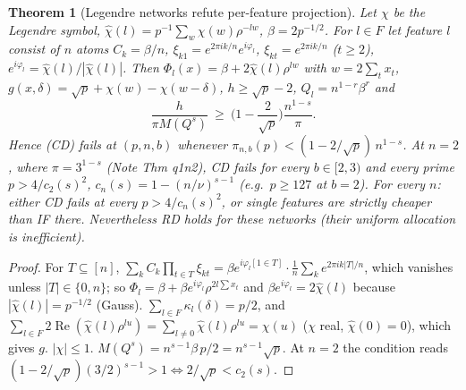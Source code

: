 \documentclass[11pt]{article}
\newtheorem{theorem}{Theorem}
\theoremstyle{remark}
\newcommand{\Re}{\operatorname{Re}}
\renewcommand{\Re}{\operatorname{Re}}
\begin{document}
\begin{theorem}[Legendre networks refute per-feature projection]\label{thm:L}
Let $\chi$ be the Legendre symbol, $\hat\chi(l)=p^{-1}\sum_w\chi(w)\rho^{-lw}$, $\beta=2p^{-1/2}$.  For $l\in F$ let feature $l$ consist of
$n$ atoms $C_k=\beta/n$, $\xi_{k1}=e^{2\pi ik/n}e^{i\varphi_l}$, $\xi_{kt}=e^{2\pi ik/n}$ ($t\ge2$), $e^{i\varphi_l}=\hat\chi(l)/|\hat\chi(l)|$.
Then $\Phi_l(x)=\beta+2\hat\chi(l)\rho^{lw}$ with $w=2\sum_tx_t$, $g(x,\delta)=\sqrt p+\chi(w)-\chi(w-\delta)$, $h\ge\sqrt p-2$,
$Q_l=n^{1-r}\beta^r$ and
\[\frac{h}{\pi M(Q^s)}\ \ge\ \Big(1-\frac2{\sqrt p}\Big)\frac{n^{1-s}}{\pi}.\]
Hence (CD) fails at $(p,n,b)$ whenever $\pi_{n,b}(p)<(1-2/\sqrt p)\,n^{1-s}$.  At $n=2$, where $\pi=3^{1-s}$ (Note Thm q1n2), CD fails
for every $b\in[2,3)$ and every prime $p>4/c_2(s)^2$, $c_n(s)=1-(n/\nu)^{s-1}$ (e.g.\ $p\ge127$ at $b=2$).  For every $n$:
either CD fails at every $p>4/c_n(s)^2$, or single features are strictly cheaper than IF there.
Nevertheless RD holds for these networks (their uniform allocation is inefficient).
\end{theorem}
\begin{proof}
For $T\subseteq[n]$, $\sum_kC_k\prod_{t\in T}\xi_{kt}=\beta e^{i\varphi_l[1\in T]}\cdot\frac1n\sum_ke^{2\pi ik|T|/n}$, which vanishes unless
$|T|\in\{0,n\}$; so $\Phi_l=\beta+\beta e^{i\varphi_l}\rho^{2l\sum x_t}$ and $\beta e^{i\varphi_l}=2\hat\chi(l)$ because $|\hat\chi(l)|=p^{-1/2}$ (Gauss).
$\sum_{l\in F}\kappa_l(\delta)=p/2$, and $\sum_{l\in F}2\Re(\hat\chi(l)\rho^{lu})=\sum_{l\ne0}\hat\chi(l)\rho^{lu}=\chi(u)$ ($\chi$ real,
$\hat\chi(0)=0$), which gives $g$.  $|\chi|\le1$.  $M(Q^s)=n^{s-1}\beta\,p/2=n^{s-1}\sqrt p$.  At $n=2$ the condition reads
$(1-2/\sqrt p)(3/2)^{s-1}>1\iff 2/\sqrt p<c_2(s)$.
\end{proof}
\end{document}
